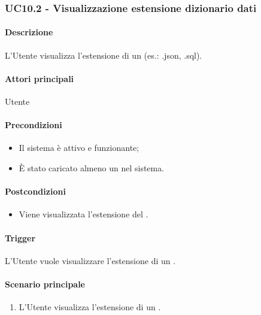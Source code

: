 
\subsubsection{UC10.2 - Visualizzazione estensione dizionario dati}\label{UC10point2}
\paragraph*{Descrizione}
L'Utente visualizza l'estensione di un  (es.: .json, .sql).

\paragraph*{Attori principali}
Utente

\paragraph*{Precondizioni}
\begin{itemize}
  \item Il sistema è attivo e funzionante;
  \item È stato caricato almeno un  nel sistema. 
\end{itemize}

\paragraph*{Postcondizioni}
\begin{itemize}
  \item Viene visualizzata l'estensione del .
\end{itemize}

\paragraph*{Trigger}
L'Utente vuole visualizzare l'estensione di un .

\paragraph*{Scenario principale}
\begin{enumerate}
  \item L'Utente visualizza l'estensione di un .
\end{enumerate}

